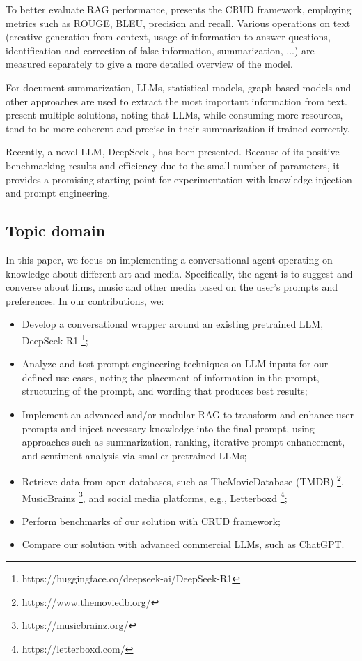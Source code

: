 \documentclass[fleqn,moreauthors,10pt]{ds_report}
\begin{document}
To better evaluate RAG performance, \cite{benchmark} presents the CRUD framework, employing metrics such as ROUGE, BLEU, precision and recall. Various operations on text (creative generation from context, usage of information to answer questions, identification and correction of false information, summarization, ...) are measured separately to give a more detailed overview of the model. 

For document summarization, LLMs, statistical models, graph-based models and other approaches are used to extract the most important information from text. \cite{summarization} present multiple solutions, noting that LLMs, while consuming more resources, tend to be more coherent and precise in their summarization if trained correctly. 

Recently, a novel LLM, DeepSeek \cite{deepseek3}, has been presented. Because of its positive benchmarking results and efficiency due to the small number of parameters, it provides a promising starting point for experimentation with knowledge injection and prompt engineering. 

\subsection*{Topic domain}
In this paper, we focus on implementing a conversational agent operating on knowledge about different art and media. Specifically, the agent is to suggest and converse about films, music and other media based on the user’s prompts and preferences. In our contributions, we: 
\begin{itemize}
\item Develop a conversational wrapper around an existing pretrained LLM, DeepSeek-R1 \footnote{https://huggingface.co/deepseek-ai/DeepSeek-R1}; 
\item Analyze and test prompt engineering techniques on LLM inputs for our defined use cases, noting the placement of information in the prompt, structuring of the prompt, and wording that produces best results; 
\item Implement an advanced and/or modular RAG to transform and enhance user prompts and inject necessary knowledge into the final prompt, using approaches such as summarization, ranking, iterative prompt enhancement, and sentiment analysis via smaller pretrained LLMs; 
\item Retrieve data from open databases, such as The\-Movie\-Database (TMDB) \footnote{https://www.themoviedb.org/}, MusicBrainz \footnote{https://musicbrainz.org/}, and social media platforms, e.g., Letterboxd \footnote{https://letterboxd.com/}; 
\item Perform benchmarks of our solution with CRUD framework; 
\item Compare our solution with advanced commercial LLMs, such as ChatGPT. 
\end{itemize}
\end{document}
